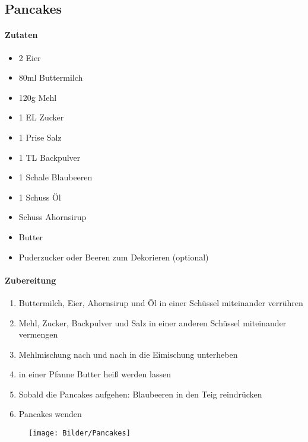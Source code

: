 \newpage
\subsection{Pancakes}
\paragraph{Zutaten}
\begin{itemize}[noitemsep]
	\item 2 Eier 
	\item 80ml Buttermilch
	\item 120g Mehl 
	\item 1 EL Zucker
	\item 1 Prise Salz
	\item 1 TL Backpulver
	\item 1 Schale Blaubeeren
	\item 1 Schuss Öl	
	\item Schuss Ahornsirup
	\item Butter
	\item Puderzucker oder Beeren zum Dekorieren (optional)
\end{itemize}
\paragraph{Zubereitung}
\begin{enumerate}[noitemsep]
	\item Buttermilch, Eier, Ahornsirup und Öl in einer Schüssel miteinander verrühren 
	\item Mehl, Zucker, Backpulver und Salz in einer anderen Schüssel miteinander vermengen 
	\item Mehlmischung nach und nach in die Eimischung unterheben
	\item in einer Pfanne Butter heiß werden lassen 
	\item Sobald die Pancakes aufgehen: Blaubeeren in den Teig reindrücken
	\item Pancakes wenden
\end{enumerate}
\begin{figure}[h]
\centering
\texttt{[image: Bilder/Pancakes]}
\end{figure}